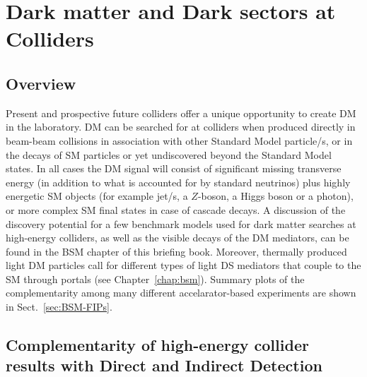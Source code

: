 \documentclass[../report.tex]{subfiles}
\begin{document}
\section{Dark matter and Dark sectors at Colliders}

\subsection{Overview}

Present and prospective future colliders offer a unique opportunity to create DM in the laboratory. 
DM can be searched for at colliders when produced directly in beam-beam collisions in association with other Standard Model particle/s, or in the decays of SM particles or yet undiscovered beyond the Standard Model states. 
In all cases the DM signal will consist of significant missing transverse energy (in addition to what is accounted for by standard neutrinos) plus highly energetic SM objects (for example jet/s, a $Z$-boson, a Higgs boson or a photon), or more complex SM final states in case of cascade decays. A discussion of the discovery potential for a few  benchmark models used for dark matter searches at high-energy colliders, as well as the visible decays of the DM mediators, can be found in the BSM chapter of this briefing book. 
Moreover, thermally produced light DM particles  call for different types of light DS mediators that couple to the SM through portals (see Chapter~\ref{chap:bsm}). 
Summary plots of the complementarity among many different accelarator-based experiments are shown in Sect.~\ref{sec:BSM-FIPs}.

\subsection{Complementarity of high-energy collider results with Direct and Indirect Detection}
\label{subsec:complementarity_collider}
\end{document}
